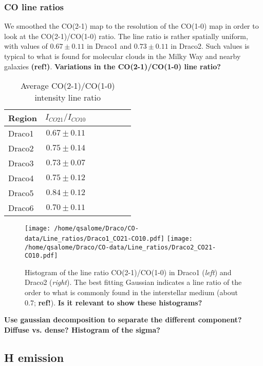 \documentclass[traditabstract]{aa}
\begin{document}
      \subsubsection{CO line ratios}

   We smoothed the CO(2-1) map to the resolution of the CO(1-0) map in order to look at the CO(2-1)/CO(1-0) ratio. The line ratio is rather spatially uniform, with values of $0.67\pm 0.11$ in Draco1 and $0.73\pm 0.11$ in Draco2. Such values is typical to what is found for molecular clouds in the Milky Way and nearby galaxies \textbf{(ref!)}. \textbf{Variations in the CO(2-1)/CO(1-0) line ratio?}

\begin{table}[h]
  \centering
  \footnotesize
  \caption{Average CO(2-1)/CO(1-0) intensity line ratio}
  \begin{tabular}{lcccccc}
    \hline \hline
    Region & $I_{CO21}/I_{CO10}$ \\ \hline
    Draco1 &   $0.67\pm 0.11$    \\
    Draco2 &   $0.75\pm 0.14$    \\
    Draco3 &   $0.73\pm 0.07$    \\
    Draco4 &   $0.75\pm 0.12$    \\
    Draco5 &   $0.84\pm 0.12$    \\
    Draco6 &   $0.70\pm 0.11$    \\ \hline
  \end{tabular}
\end{table}

\begin{figure*}[h!]
  \centering
  \texttt{[image: /home/qsalome/Draco/CO-data/Line\_ratios/Draco1\_CO21-CO10.pdf]}
  \hspace{3mm}
  \texttt{[image: /home/qsalome/Draco/CO-data/Line\_ratios/Draco2\_CO21-CO10.pdf]}
  \caption{\label{ratio} Histogram of the line ratio CO(2-1)/CO(1-0) in Draco1 (\emph{left}) and Draco2 (\emph{right}). The best fitting Gaussian indicates a line ratio of the order to what is commonly found in the interstellar medium (about 0.7; \textbf{ref!}). \textbf{Is it relevant to show these histograms?}}
\end{figure*}

\textbf{Use gaussian decomposition to separate the different component? Diffuse vs. dense? Histogram of the sigma?}


   \subsection{H emission}
   \label{sec:HI-data}
\end{document}
